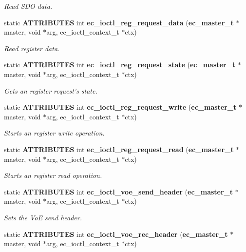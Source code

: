 \begin{DoxyCompactItemize}
\begin{DoxyCompactList}\small\item\em Read S\-D\-O data. \end{DoxyCompactList}\item 
static {\bf A\-T\-T\-R\-I\-B\-U\-T\-E\-S} int {\bf ec\-\_\-ioctl\-\_\-reg\-\_\-request\-\_\-data} ({\bf ec\-\_\-master\-\_\-t} $\ast$master, void $\ast$arg, ec\-\_\-ioctl\-\_\-context\-\_\-t $\ast$ctx)
\begin{DoxyCompactList}\small\item\em Read register data. \end{DoxyCompactList}\item 
static {\bf A\-T\-T\-R\-I\-B\-U\-T\-E\-S} int {\bf ec\-\_\-ioctl\-\_\-reg\-\_\-request\-\_\-state} ({\bf ec\-\_\-master\-\_\-t} $\ast$master, void $\ast$arg, ec\-\_\-ioctl\-\_\-context\-\_\-t $\ast$ctx)
\begin{DoxyCompactList}\small\item\em Gets an register request's state. \end{DoxyCompactList}\item 
static {\bf A\-T\-T\-R\-I\-B\-U\-T\-E\-S} int {\bf ec\-\_\-ioctl\-\_\-reg\-\_\-request\-\_\-write} ({\bf ec\-\_\-master\-\_\-t} $\ast$master, void $\ast$arg, ec\-\_\-ioctl\-\_\-context\-\_\-t $\ast$ctx)
\begin{DoxyCompactList}\small\item\em Starts an register write operation. \end{DoxyCompactList}\item 
static {\bf A\-T\-T\-R\-I\-B\-U\-T\-E\-S} int {\bf ec\-\_\-ioctl\-\_\-reg\-\_\-request\-\_\-read} ({\bf ec\-\_\-master\-\_\-t} $\ast$master, void $\ast$arg, ec\-\_\-ioctl\-\_\-context\-\_\-t $\ast$ctx)
\begin{DoxyCompactList}\small\item\em Starts an register read operation. \end{DoxyCompactList}\item 
static {\bf A\-T\-T\-R\-I\-B\-U\-T\-E\-S} int {\bf ec\-\_\-ioctl\-\_\-voe\-\_\-send\-\_\-header} ({\bf ec\-\_\-master\-\_\-t} $\ast$master, void $\ast$arg, ec\-\_\-ioctl\-\_\-context\-\_\-t $\ast$ctx)
\begin{DoxyCompactList}\small\item\em Sets the Vo\-E send header. \end{DoxyCompactList}\item 
static {\bf A\-T\-T\-R\-I\-B\-U\-T\-E\-S} int {\bf ec\-\_\-ioctl\-\_\-voe\-\_\-rec\-\_\-header} ({\bf ec\-\_\-master\-\_\-t} $\ast$master, void $\ast$arg, ec\-\_\-ioctl\-\_\-context\-\_\-t $\ast$ctx)

\end{DoxyCompactItemize}
